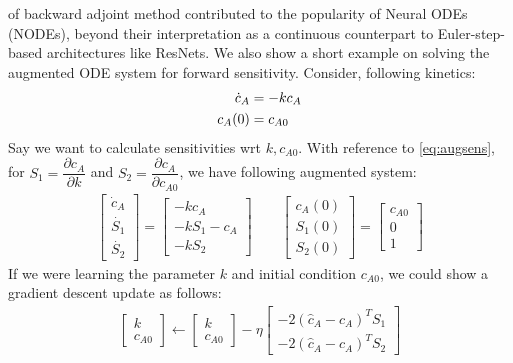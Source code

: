\documentclass[fontsize=11pt]{article}
\theoremstyle{definition}
\begin{document}
of backward adjoint method contributed to the popularity of Neural ODEs (NODEs), beyond their interpretation 
as a continuous counterpart to Euler-step-based architectures like ResNets. We also show 
a short example on solving the augmented ODE system for forward sensitivity. Consider, 
following kinetics:
\begin{align}
    \dot{c}_A &= -kc_A \notag \\
    c_A(0) &= c_{A0}
\end{align}
Say we want to calculate sensitivities wrt $k, c_{A0}$. With reference to \cref{eq:augsens},
for $S_1 = \dfrac{\partial c_A}{\partial k}$ and $S_2 = \dfrac{\partial c_A}{\partial c_{A0}}$,
we have following augmented system:
\begin{align}
    \begin{bmatrix} 
        \dot{c}_A \\
        \dot{S_1} \\ 
        \dot{S_2} 
    \end{bmatrix} = 
    \begin{bmatrix}
        -kc_A \\
        -kS_1 - c_A \\
        -kS_2 \end{bmatrix}
    \qquad
    \begin{bmatrix} 
        c_A(0) \\ 
        S_1(0) \\ 
        S_2(0) 
    \end{bmatrix} =
    \begin{bmatrix} 
        c_{A0} \\ 
        0 \\ 
        1
    \end{bmatrix}
\end{align}
If we were learning the parameter $k$ and initial condition $c_{A0}$, we could
show a gradient descent update as follows:
\begin{align}
    \begin{bmatrix} k \\ c_{A0} \end{bmatrix} \leftarrow
    \begin{bmatrix} k \\ c_{A0} \end{bmatrix}
    - \eta 
    \begin{bmatrix} 
        -2 (\hat{c}_A  - c_A)^T S_1 \\ 
        -2 (\hat{c}_A  - c_A)^T S_2
    \end{bmatrix}
\end{align}
\end{document}
